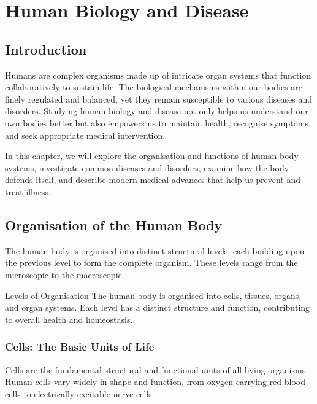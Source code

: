\chapter{Human Biology and Disease}

\section{Introduction}

Humans are complex organisms made up of intricate organ systems that function collaboratively to sustain life. The biological mechanisms within our bodies are finely regulated and balanced, yet they remain susceptible to various diseases and disorders. Studying human biology and disease not only helps us understand our own bodies better but also empowers us to maintain health, recognise symptoms, and seek appropriate medical intervention.

In this chapter, we will explore the organisation and functions of human body systems, investigate common diseases and disorders, examine how the body defends itself, and describe modern medical advances that help us prevent and treat illness. 

\section{Organisation of the Human Body}

The human body is organised into distinct structural levels, each building upon the previous level to form the complete organism. These levels range from the microscopic to the macroscopic.

\begin{keyconcept}{Levels of Organisation}
The human body is organised into cells, tissues, organs, and organ systems. Each level has a distinct structure and function, contributing to overall health and homeostasis.
\end{keyconcept}

\subsection{Cells: The Basic Units of Life}

Cells are the fundamental structural and functional units of all living organisms. Human cells vary widely in shape and function, from oxygen-carrying red blood cells to electrically excitable nerve cells.


